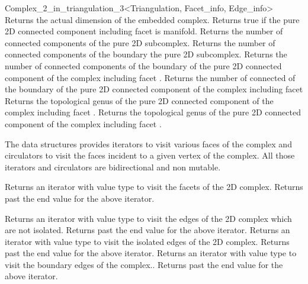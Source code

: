\begin{ccRefClass}{Complex_2_in_triangulation_3<Triangulation, Facet_info, Edge_info>}
{Returns the actual dimension of the embedded complex.}
\ccGlue
{}
\ccGlue
{}
\ccGlue
{}
{Returns true if the pure 2D  
connected component including  facet  is manifold.}
\ccGlue
{}
{Returns the number of connected components of the pure 2D
subcomplex.}
\ccGlue
{}
{Returns the number of connected components of the boundary
  the pure 2D subcomplex.}
\ccGlue
{}
{Returns the number of connected components of the boundary
of the pure 2D connected component of the complex including facet .}
\ccGlue
{}
{Returns the number of connected of the boundary
of the pure 2D connected component of the complex including facet
}
\ccGlue
{}
{Returns the topological genus 
of the pure 2D connected component of the complex including facet .}
\ccGlue
{}
{Returns the topological genus 
of the pure 2D connected component of the complex including facet .}


The data structures provides iterators  to visit  
various faces of the complex and circulators to visit the faces
incident to a given vertex of the complex.
All those iterators and circulators are bidirectional and
non mutable. 

{Returns an iterator with value type  to visit the facets
of the 2D complex.}
\ccGlue
{}
{Returns past the end value for the above iterator.}

{Returns an iterator with value type  to visit the
edges of the 2D complex which are not isolated.}
\ccGlue
{}
{Returns past the end value for the above iterator.}
\ccGlue
{}
{Returns an iterator with value type  to visit the
isolated edges of the 2D complex.}
\ccGlue
{}
{Returns past the end value for the above iterator.}
\ccGlue
{}
{Returns an iterator with value type  to visit the
boundary  edges of the complex..}
\ccGlue
{}
{Returns past the end value for the above iterator.}


\end{ccRefClass}
